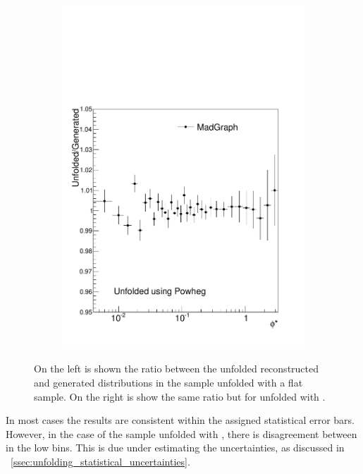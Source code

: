 \begin{figure}[!htbp]
\begin{subfigure}[b]{\SideBySidePlotWidth}
        \includegraphics[width=\textwidth]{figures/BinM_PM.pdf}
        \caption{}
        \label{fig:unfolding_madgraph_with_powheg}
    \end{subfigure}
    \caption{
        On the left is shown the ratio between the unfolded reconstructed and
        generated \phistar distributions in the \POWHEG sample unfolded with a
        flat \MADGRAPH sample. On the right is show the same ratio but for
        \MADGRAPH unfolded with \POWHEG.
    }
    \label{fig:cross_mc_unfolding}
\end{figure}

In most cases the results are consistent within the assigned statistical error
bars. However, in the case of the \MADGRAPH sample unfolded with \POWHEG, there
is disagreement between in the low \phistar bins. This is due \RooUnfold under
estimating the uncertainties, as discussed in
\SEC~\ref{ssec:unfolding_statistical_uncertainties}.

